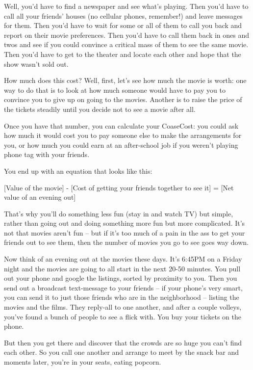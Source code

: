 Well, you'd have to find a newspaper and see what's playing. Then
you'd have to call all your friends' houses (no cellular phones,
remember!) and leave messages for them. Then you'd have to wait for
some or all of them to call you back and report on their movie
preferences. Then you'd have to call them back in ones and twos and
see if you could convince a critical mass of them to see the same
movie. Then you'd have to get to the theater and locate each other
and hope that the show wasn't sold out.

How much does this cost? Well, first, let's see how much the movie
is worth: one way to do that is to look at how much someone would
have to pay you to convince you to give up on going to the movies.
Another is to raise the price of the tickets steadily until you
decide not to see a movie after all.

Once you have that number, you can calculate your CoaseCost: you
could ask how much it would cost you to pay someone else to make
the arrangements for you, or how much you could earn at an
after-school job if you weren't playing phone tag with your
friends.

You end up with an equation that looks like this:

[Value of the movie] - [Cost of getting your friends together to
see it] = [Net value of an evening out]

That's why you'll do something less fun (stay in and watch TV) but
simple, rather than going out and doing something more fun but more
complicated. It's not that movies aren't fun -- but if it's too
much of a pain in the ass to get your friends out to see them, then
the number of movies you go to see goes way down.

Now think of an evening out at the movies these days. It's 6:45PM
on a Friday night and the movies are going to all start in the next
20-50 minutes. You pull out your phone and google the listings,
sorted by proximity to you. Then you send out a broadcast
text-message to your friends -- if your phone's very smart, you can
send it to just those friends who are in the neighborhood --
listing the movies and the films. They reply-all to one another,
and after a couple volleys, you've found a bunch of people to see a
flick with. You buy your tickets on the phone.

But then you get there and discover that the crowds are so huge you
can't find each other. So you call one another and arrange to meet
by the snack bar and moments later, you're in your seats, eating
popcorn.

